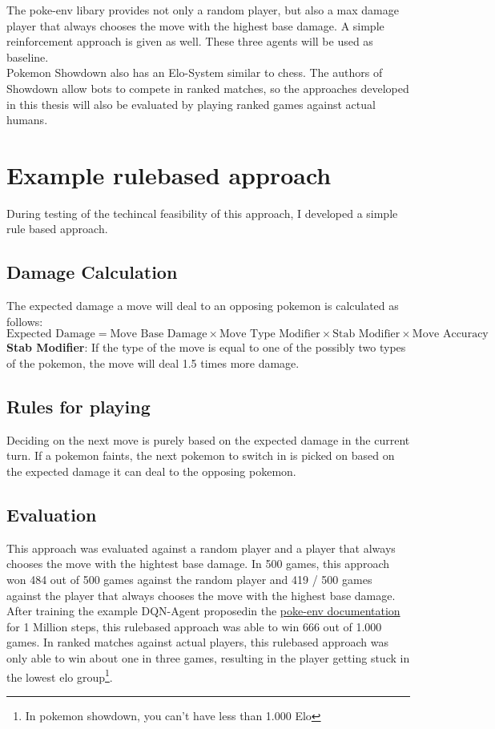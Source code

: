 \documentclass{article}
\begin{document}
The poke-env libary provides not only a random player, but also a max damage player
that always chooses the move with the highest base damage. A simple reinforcement
approach is given as well. These three agents will be used as baseline. \\
Pokemon Showdown also has an Elo-System similar to chess. The authors of 
Showdown allow bots to compete in ranked matches, so the approaches
developed in this thesis will also be evaluated by playing ranked games 
against actual humans.

\section{Example rulebased approach}
\label{sec:rulebased}
During testing of the techincal feasibility of this approach, I developed a 
simple rule based approach.

\subsection{Damage Calculation}
The expected damage a move will deal to an opposing pokemon is calculated as follows:
\begin{equation*}
    \text{Expected Damage} = \text{Move Base Damage} \times \text{Move Type Modifier} 
        \times \text{Stab Modifier}
        \times \text{Move Accuracy}
\end{equation*}
\textbf{Stab Modifier}: If the type of the move is equal to one of the possibly two types
of the pokemon, the move will deal 1.5 times more damage. 

\subsection{Rules for playing}
Deciding on the next move is purely based on the expected damage in the current turn.
If a pokemon faints, the next pokemon to switch in is picked on based on the expected
damage it can deal to the opposing pokemon.

\subsection{Evaluation}
This approach was evaluated against a random player and a player that always chooses
the move with the hightest base damage. In 500 games, this approach won 484 out of 500
games against the random player and 419 / 500 games against the player that always chooses
the move with the highest base damage. \\
After training the example DQN-Agent proposedin the
\href{https://poke-env.readthedocs.io/en/latest/rl_with_open_ai_gym_wrapper.html}{poke-env documentation}
for 1 Million steps, this rulebased approach was able to win 666 out of 1.000 games. In ranked matches
against actual players, this rulebased approach was only able to win about one in three games, resulting
in the player getting stuck in the lowest elo group\footnote{In pokemon showdown, you can't have less
than 1.000 Elo}.
\end{document}
